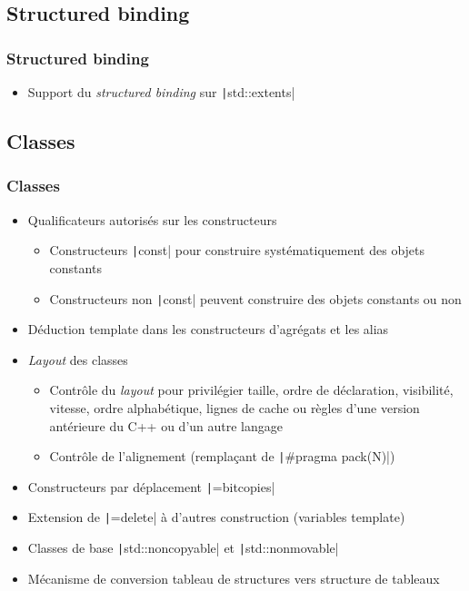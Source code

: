 \documentclass[C++.tex]{subfiles}
\begin{document}
\subsection*{Structured binding}
\begin{frame}[fragile]
	\frametitle{Structured binding}
	\begin{itemize}
		\item Support du \textit{structured binding} sur \texttt|std::extents|
	\end{itemize}

\end{frame}

\subsection*{Classes}
\begin{frame}[fragile]
	\frametitle{Classes}
	\begin{itemize}
		\item Qualificateurs autorisés sur les constructeurs
		\begin{itemize}
			\item Constructeurs \texttt|const| pour construire systématiquement des objets constants
			\item Constructeurs non \texttt|const| peuvent construire des objets constants ou non
		\end{itemize}
		\item Déduction template dans les constructeurs d'agrégats et les alias
		\item \textit{Layout} des classes
		\begin{itemize}
			\item Contrôle du \textit{layout} pour privilégier taille, ordre de déclaration, visibilité, vitesse, ordre alphabétique, lignes de cache ou règles d'une version antérieure du C++ ou d'un autre langage
			\item Contrôle de l'alignement (remplaçant de \texttt|#pragma pack(N)|)
		\end{itemize}
		\item Constructeurs par déplacement \texttt|=bitcopies|
		\item Extension de \texttt|=delete| à d'autres construction (variables template)
		\item Classes de base \texttt|std::noncopyable| et \texttt|std::nonmovable|
		\item Mécanisme de conversion tableau de structures vers structure de tableaux

	\end{itemize}

\end{frame}
\end{document}
